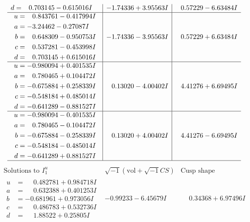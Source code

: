\documentclass[1p]{elsarticle_modified}
\theoremstyle{definition}
\newcommand{\I}{\sqrt{-1}}
\begin{document}
$$\begin{array}{c|c|c}
\begin{aligned}
d &= \phantom{-}0.703145 - 0.615016 I\end{aligned}
 & -1.74336 + 3.95563 I & \phantom{-}0.57229 - 6.63484 I \\ \hline\begin{aligned}
u &= \phantom{-}0.843761 - 0.417994 I \\
a &= -3.24462 - 0.27087 I \\
b &= \phantom{-}0.648309 - 0.950753 I \\
c &= \phantom{-}0.537281 - 0.453998 I \\
d &= \phantom{-}0.703145 + 0.615016 I\end{aligned}
 & -1.74336 - 3.95563 I & \phantom{-}0.57229 + 6.63484 I \\ \hline\begin{aligned}
u &= -0.980094 + 0.401535 I \\
a &= \phantom{-}0.780465 + 0.104472 I \\
b &= -0.675884 + 0.258339 I \\
c &= -0.548184 + 0.485014 I \\
d &= -0.641289 - 0.881527 I\end{aligned}
 & \phantom{-}0.13020 - 4.00402 I & \phantom{-}4.41276 + 6.69495 I \\ \hline\begin{aligned}
u &= -0.980094 - 0.401535 I \\
a &= \phantom{-}0.780465 - 0.104472 I \\
b &= -0.675884 - 0.258339 I \\
c &= -0.548184 - 0.485014 I \\
d &= -0.641289 + 0.881527 I\end{aligned}
 & \phantom{-}0.13020 + 4.00402 I & \phantom{-}4.41276 - 6.69495 I\\
 \hline 
 \end{array}$$\newpage$$\begin{array}{c|c|c}  
\text{Solutions to }I^u_{1}& \I (\text{vol} + \sqrt{-1}CS) & \text{Cusp shape}\\
 \hline 
\begin{aligned}
u &= \phantom{-}0.482781 + 0.984718 I \\
a &= \phantom{-}0.632388 + 0.401253 I \\
b &= -0.681961 + 0.973056 I \\
c &= \phantom{-}0.486783 + 0.532736 I \\
d &= \phantom{-}1.88522 + 0.25805 I\end{aligned}
 & -0.99233 - 6.45679 I & \phantom{-}0.34368 + 6.97496 I \\ \hline\begin{aligned}

\end{aligned}
\end{array}$$
\end{document}
